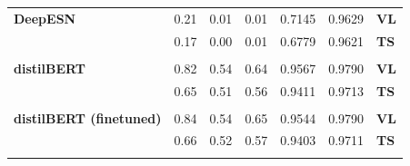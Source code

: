 \documentclass[10.5pt]{article}
\begin{document}
\begin{center}
\begin{tabularx}{\textwidth}{Y |YYYYY|Y}
\textbf{DeepESN} & 0.21 & 0.01 & 0.01 & 0.7145 & 0.9629 & \textbf{VL} \\
 & 0.17 & 0.00 & 0.01 & 0.6779 & 0.9621 & \textbf{TS} \vspace{0.1cm}\\ 

\hline\\

\textbf{distilBERT} & 0.82 & 0.54 & 0.64 & 0.9567 & 0.9790 & \textbf{VL} \\
 & 0.65 & 0.51 & 0.56 & 0.9411 & 0.9713 & \textbf{TS} \vspace{0.1cm}\\ 

\hline\\

\textbf{distilBERT (finetuned)} & 0.84 & 0.54 & 0.65 & 0.9544 & 0.9790 & \textbf{VL} \\
 & 0.66 & 0.52 & 0.57 & 0.9403 & 0.9711 & \textbf{TS} \vspace{0.1cm}\\ 

\hline\\

\end{tabularx}
\label{tab_val_scores}
\end{center}
\vspace{0.3cm}
\end{document}

